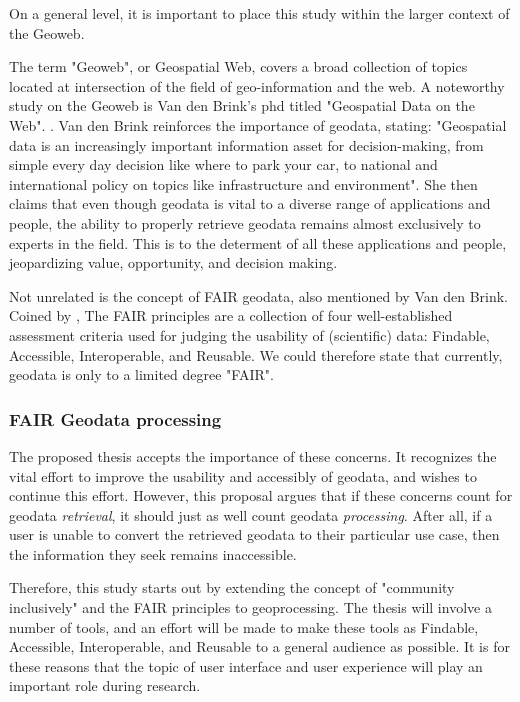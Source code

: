 

On a general level, it is important to place this study within the larger context of the Geoweb. 

The term "Geoweb", or Geospatial Web, covers a broad collection of topics located at intersection of the field of geo-information and the web.
A noteworthy study on the Geoweb is Van den Brink's phd titled "Geospatial Data on the Web". \cite{brink_geospatial_2018}. 
Van den Brink reinforces the importance of geodata, stating: "Geospatial data is an increasingly important information asset for decision-making, from simple every day decision like where to park your car, to national and international policy on topics like infrastructure and environment". 
She then claims that even though geodata is vital to a diverse range of applications and people, the ability to properly retrieve geodata remains almost exclusively to experts in the field. 
This is to the determent of all these applications and people, jeopardizing value, opportunity, and decision making.

Not unrelated is the concept of FAIR geodata, also mentioned by Van den Brink. 
Coined by \cite{mark_d_wilkinson_fair_2016}, The FAIR principles are a collection of four well-established assessment criteria used for judging the usability of (scientific) data: Findable, Accessible, Interoperable, and Reusable. 
We could therefore state that currently, geodata is only to a limited degree "FAIR".

\subsubsection*{FAIR Geodata processing}

The proposed thesis accepts the importance of these concerns. 
It recognizes the vital effort to improve the usability and accessibly of geodata, and wishes to continue this effort. However, this proposal argues that if these concerns count for geodata \textit{retrieval}, it should just as well count geodata \textit{processing}. After all, if a user is unable to convert the retrieved geodata to their particular use case, then the information they seek remains inaccessible. 

Therefore, this study starts out by extending the concept of "community inclusively" and the FAIR principles to geoprocessing. The thesis will involve a number of tools, and an effort will be made to make these tools as Findable, Accessible, Interoperable, and Reusable to a general audience as possible. It is for these reasons that the topic of user interface and user experience will play an important role during research. 

